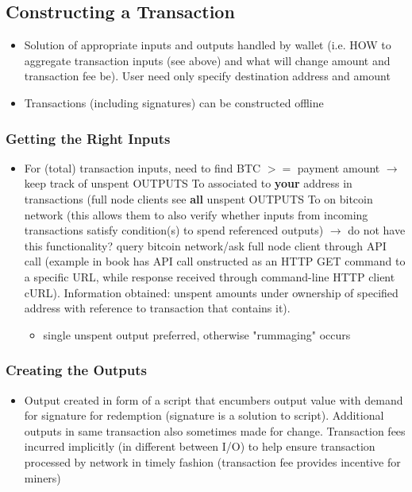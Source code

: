 \documentclass[english, 11pt]{article}
\begin{document}
\subsection{Constructing a Transaction}
\begin{itemize}
    \item Solution of appropriate inputs and outputs handled by wallet (i.e. HOW to aggregate transaction inputs (see above) and what will change amount and transaction fee be). User need only specify destination address and amount
    \item Transactions (including signatures) can be constructed offline
\end{itemize}

\subsubsection{Getting the Right Inputs}
\begin{itemize}
    \item For (total) transaction inputs, need to find BTC $>=$ payment amount $\rightarrow$ keep track of unspent OUTPUTS To associated to \textbf{your} address in transactions (full node clients see \textbf{all} unspent OUTPUTS To on bitcoin network (this allows them to also verify whether inputs from incoming transactions satisfy condition(s) to spend referenced outputs) $\rightarrow$ do not have this functionality? query bitcoin network/ask full node client through API call (example in book has API call onstructed as an HTTP GET command to a specific URL, while response received through command-line HTTP client cURL). Information obtained: unspent amounts under ownership of specified address with reference to transaction that contains it).
    \begin{itemize}
        \item single unspent output preferred, otherwise "rummaging" occurs
    \end{itemize}
\end{itemize}

\subsubsection{Creating the Outputs}
\begin{itemize}
    \item Output created in form of a script that encumbers output value with demand for signature for redemption (signature is a solution to script). Additional outputs in same transaction also sometimes made for change. Transaction fees incurred implicitly (in different between I/O) to help ensure transaction processed by network in timely fashion (transaction fee provides incentive for miners)
\end{itemize}
\end{document}

